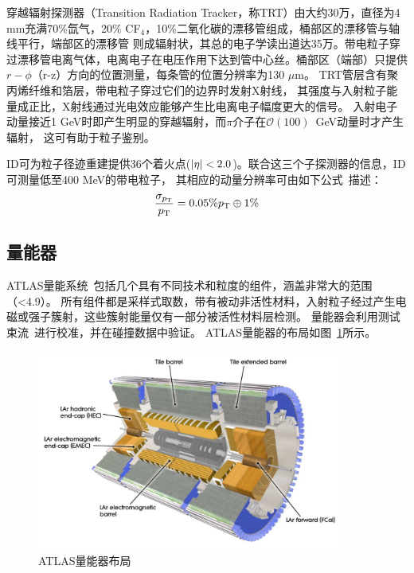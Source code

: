 穿越辐射探测器（Transition Radiation Tracker，称TRT）由大约30万，直径为4 mm充满70\%氙气，20\% CF$_4$，10\%二氧化碳的漂移管组成，桶部区的漂移管与轴线平行，端部区的漂移管
则成辐射状，其总的电子学读出道达35万。带电粒子穿过漂移管电离气体，电离电子在电压作用下达到管中心丝。桶部区（端部）只提供$r-\phi$（r-z）方向的位置测量，每条管的位置分辨率为130 $\mu\text{m}$。
TRT管层含有聚丙烯纤维和箔层，带电粒子穿过它们的边界时发射X射线，
其强度与入射粒子能量成正比，X射线通过光电效应能够产生比电离电子幅度更大的信号。
入射电子动量接近1 GeV时即产生明显的穿越辐射，而$\pi$介子在$\mathcal{O(100)}$~GeV动量时才产生辐射，
这可有助于粒子鉴别。

ID可为粒子径迹重建提供36个着火点($|\eta| < 2.0$)。联合这三个子探测器的信息，ID可测量\pt 低至400 MeV的带电粒子，
其相应的动量分辨率可由如下公式~\cite{ATLAS_Collaboration_2008}描述：
\begin{equation}
 \frac{\sigma_{p_{\text{T}}}}{p_{\text{T}}}=0.05\%p_{\text{T}}\oplus1\%
\end{equation}

\subsection{量能器}
ATLAS量能系统~\cite{ATLAS_Collaboration_2008}包括几个具有不同技术和粒度的组件，涵盖非常大的范围（\abseta <4.9）。 所有组件都是采样式取数，带有被动非活性材料，入射粒子经过产生电磁或强子簇射，这些簇射能量仅有一部分被活性材料层检测。 量能器会利用测试束流~\cite{4436305,Davidek_2009}进行校准，并在碰撞数据中验证。 
ATLAS量能器的布局如图~\ref{fig:Calorimeter_d3}所示。
\begin{figure}[h]
\begin{center}
\includegraphics[width=0.9\textwidth]{fig/Calorimeter_d3.pdf}
\caption{ATLAS量能器布局} \label{fig:Calorimeter_d3}
\end{center}
\end{figure}

